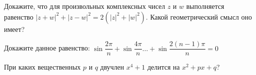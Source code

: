 \documentclass{article}
\begin{document}
    \begin{task_boxed}
        Докажите, что для произвольных комплексных чисел $z$ и $w$ выполняется равенство  $|z + w|^2 + | z - w|^2 = 2(|z|^2 + |w|^2)$.
        Какой геометрический смысл оно имеет?
    \end{task_boxed}

    \begin{task_boxed}
        Докажите данное равенство: $\sin{\dfrac{2\pi}{n}} + \sin{\dfrac{4\pi}{n}} \dots +\sin{\dfrac{2(n-1)\pi}{n}} = 0$
    \end{task_boxed}

    \begin{task_boxed}
        При каких вещественных $p$ и $q$ двучлен  $x^4 + 1$  делится на  $x^2 + px + q$?%
    \end{task_boxed}
\end{document}
